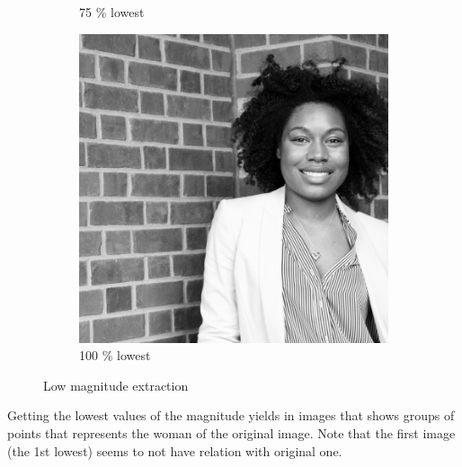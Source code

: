 \begin{figure}[h!]
\begin{subfigure}{0.2\textwidth}
  \caption{75 \% lowest}
\end{subfigure}%
\begin{subfigure}{0.2\textwidth}
  \centering
  \includegraphics[width=0.95\linewidth]{output/magnitud_low_100.jpg}
  \caption{100 \% lowest}
\end{subfigure}%
 \caption{Low magnitude extraction}
\label{fig:low-magnitude}
\end{figure}

Getting the lowest values of the magnitude yields in images that shows groups of points that represents the woman of the original image. Note that the first image (the 1st lowest) seems to not have relation with original one.

